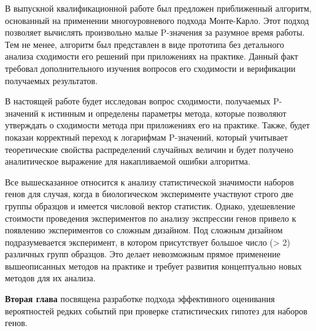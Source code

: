 В выпускной квалификационной работе \cite{KorotkevichVKR} был предложен приближенный алгоритм, основанный на применении многоуровневого подхода Монте-Карло.
Этот подход позволяет вычислять произвольно малые P-значения за разумное время работы.
Тем не менее, алгоритм был представлен в виде прототипа без детального анализа сходимости его решений при приложениях на практике.
Данный факт требовал дополнительного изучения вопросов его сходимости и верификации получаемых результатов.

В настоящей работе будет исследован вопрос сходимости, получаемых P-значений к истинным и определены параметры метода, которые позволяют утверждать о сходимости метода при приложениях его на практике.
Также, будет показан корректный переход к логарифмам P-значений, который учитывает теоретические свойства распределений случайных величин и будет получено аналитическое выражение для накапливаемой ошибки алгоритма.

Все вышесказанное относится к анализу статистической значимости наборов генов для случая, когда в биологическом эксперименте участвуют строго две группы образцов и имеется числовой вектор статистик.
Однако, удешевление стоимости проведения экспериментов по анализу экспрессии генов привело к появлению экспериментов со сложным дизайном.
Под сложным дизайном подразумевается эксперимент, в котором присутствует большое число (> 2) различных групп образцов.
Это делает невозможным прямое применение вышеописанных методов на практике и требует развития концептуально новых методов для их анализа.




\textbf{Вторая глава} посвящена разработке подхода эффективного оценивания вероятностей редких событий при проверке статистических гипотез для наборов генов.

